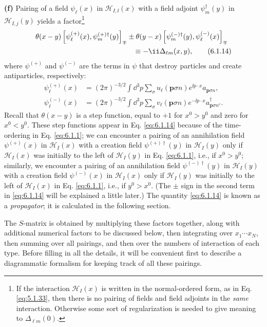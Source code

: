 \noindent\textbf{(f)} Pairing of a field $\psi_\ell(x)$ in
$\mathcal H_{I,\ii}(x)$ with a field adjoint $\psi_m^\dagger(y)$ in
$\mathcal H_{I,j}(y)$ yields a factor\footnote{If the interaction
$\mathcal H_I(x)$ is written in the normal-ordered form, as in Eq. \eqref{eq:5.1.33},
then there is no pairing of fields and field adjoints in the \emph{same}
interaction. Otherwise some sort of regularization is needed to give meaning
to $\Delta_{\ell m}(0)$.}
\begin{align}
&\theta(x-y)
\left[\psi_\ell^{(+)}(x),\psi_m^{(+)\dagger}(y)\right]_{\mp}
\mathbin{\pm}\theta(y-x)
\left[\psi_m^{(-)\dagger}(y),\psi_\ell^{(-)}(x)\right]_{\mp}
\notag\\
&\hspace{48mm}\equiv-\ii\Delta_{\ell m}(x,y),
\tag{6.1.14}
\label{eq:6.1.14}
\end{align}
where $\psi^{(+)}$ and $\psi^{(-)}$ are the terms in $\psi$ that destroy
particles and create antiparticles, respectively:
\begin{align}
\psi_\ell^{(+)}(x)
&=(2\pi)^{-3/2}\int \dd^3p\sum_\sigma
u_\ell(\mathbf p\sigma n)e^{\ii p\cdot x}a_{\mathbf p\sigma n},
\tag{6.1.15}\label{eq:6.1.15}\\
\psi_\ell^{(-)}(x)
&=(2\pi)^{-3/2}\int \dd^3p\sum_\sigma
v_\ell(\mathbf p\sigma n)e^{-\ii p\cdot x}a^\dagger_{\mathbf p\sigma n^c}.
\tag{6.1.16}
\label{eq:6.1.16}
\end{align}
Recall that $\theta(x-y)$ is a step function, equal to $+1$ for $x^0>y^0$
and zero for $x^0<y^0$. These step functions appear in Eq. \eqref{eq:6.1.14} because
of the time-ordering in Eq. \eqref{eq:6.1.1}; we can encounter a pairing of an
annihilation field $\psi^{(+)}(x)$ in $\mathcal H_I(x)$ with a creation field
$\psi^{(+)\dagger}(y)$ in $\mathcal H_I(y)$ only if $\mathcal H_I(x)$ was initially
to the left of $\mathcal H_I(y)$ in Eq. \eqref{eq:6.1.1}, i.e., if $x^0>y^0$;
similarly, we encounter a pairing of an annihilation field
$\psi^{(-)\dagger}(y)$ in $\mathcal H_I(y)$ with a creation field
$\psi^{(-)}(x)$ in $\mathcal H_I(x)$ only if $\mathcal H_I(y)$ was initially
to the left of $\mathcal H_I(x)$ in Eq. \eqref{eq:6.1.1}, i.e., if $y^0>x^0$. (The
$\pm$ sign in the second term in \eqref{eq:6.1.14} will be explained a little later.)
The quantity \eqref{eq:6.1.14} is known as a \emph{propagator}; it is calculated in the
following section.

The $S$-matrix is obtained by multiplying these factors together, along with
additional numerical factors to be discussed below, then integrating over
$x_1\cdots x_N$, then summing over all pairings, and then over the numbers of
interaction of each type. Before filling in all the details, it will be
convenient first to describe a diagrammatic formalism for keeping track of all
these pairings.

